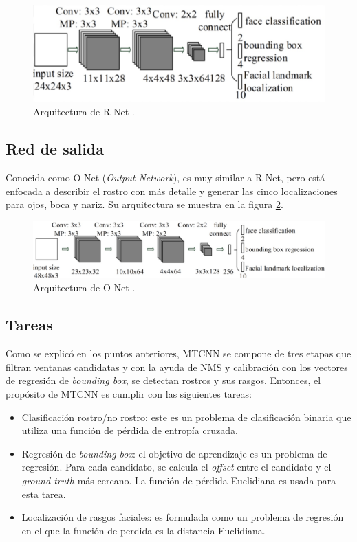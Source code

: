 \begin{figure}[h]
	\centering
	\includegraphics[scale=0.25]{./Figures/mtcnn_rnet.png}
	\caption{Arquitectura de R-Net \cite{mtcnn_info}.}
	\label{fig:mtcnn_rnet}
\end{figure}

\subsection{Red de salida}
Conocida como O-Net (\textit{Output Network}), es muy similar a R-Net, pero está enfocada a describir el rostro con más detalle y generar las cinco localizaciones para ojos, boca y nariz. Su arquitectura se muestra en la figura \ref{fig:mtcnn_onet}.

\begin{figure}[h]
	\centering
	\includegraphics[scale=0.3]{./Figures/mtcnn_onet.png}
	\caption{Arquitectura de O-Net \cite{mtcnn_info}.}
	\label{fig:mtcnn_onet}
\end{figure}

\subsection{Tareas}
Como se explicó en los puntos anteriores, MTCNN se compone de tres etapas que filtran ventanas candidatas y con la ayuda de NMS y calibración con los vectores de regresión de \textit{bounding box}, se detectan rostros y sus rasgos. Entonces, el propósito de MTCNN es cumplir con las siguientes tareas:
\begin{itemize}
	\item Clasificación rostro/no rostro: este es un problema de clasificación binaria que utiliza una función de pérdida de entropía cruzada.
	\item Regresión de \textit{bounding box}: el objetivo de aprendizaje es un problema de regresión. Para cada candidato, se calcula el \textit{offset} entre el candidato y el \textit{ground truth} \cite{ground_truth} más cercano. La función de pérdida Euclidiana es usada para esta tarea.
	\item Localización de rasgos faciales: es formulada como un problema de regresión en el que la función de perdida es la distancia Euclidiana.
\end{itemize}

